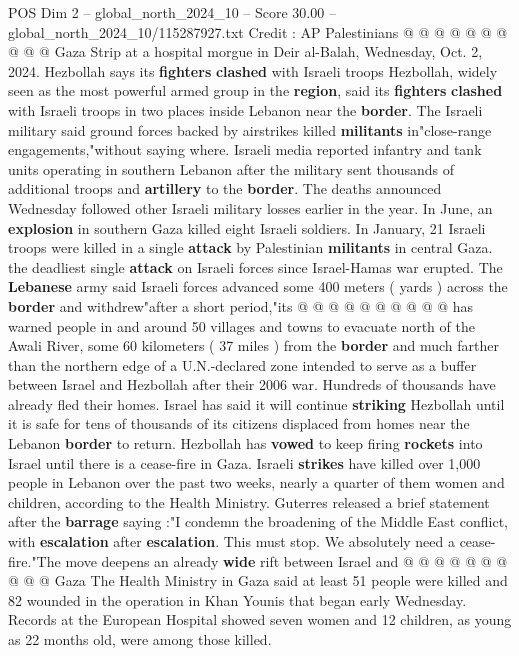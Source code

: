 \begin{textsample}{POS Dim 2 – global\_north\_2024\_10 – Score 30.00 – global\_north\_2024\_10/115287927.txt}
Credit : AP Palestinians @ @ @ @ @ @ @ @ @ @ Gaza Strip at a hospital morgue in Deir al-Balah, Wednesday, Oct. 2, 2024.
Hezbollah says its \textbf{fighters} \textbf{clashed} with Israeli troops Hezbollah, widely seen as the most powerful armed group in the \textbf{region}, said its \textbf{fighters} \textbf{clashed} with Israeli troops in two places inside Lebanon near the \textbf{border}.
The Israeli military said ground forces backed by airstrikes killed \textbf{militants} in"close-range engagements,"without saying where.
Israeli media reported infantry and tank units operating in southern Lebanon after the military sent thousands of additional troops and \textbf{artillery} to the \textbf{border}.
The deaths announced Wednesday followed other Israeli military losses earlier in the year.
In June, an \textbf{explosion} in southern Gaza killed eight Israeli soldiers.
In January, 21 Israeli troops were killed in a single \textbf{attack} by Palestinian \textbf{militants} in central Gaza. the deadliest single \textbf{attack} on Israeli forces since Israel-Hamas war erupted.
The \textbf{Lebanese} army said Israeli forces advanced some 400 meters ( yards ) across the \textbf{border} and withdrew"after a short period,"its @ @ @ @ @ @ @ @ @ @ has warned people in and around 50 villages and towns to evacuate north of the Awali River, some 60 kilometers ( 37 miles ) from the \textbf{border} and much farther than the northern edge of a U.N.-declared zone intended to serve as a buffer between Israel and Hezbollah after their 2006 war.
Hundreds of thousands have already fled their homes.
Israel has said it will continue \textbf{striking} Hezbollah until it is safe for tens of thousands of its citizens displaced from homes near the Lebanon \textbf{border} to return.
Hezbollah has \textbf{vowed} to keep firing \textbf{rockets} into Israel until there is a cease-fire in Gaza.
Israeli \textbf{strikes} have killed over 1,000 people in Lebanon over the past two weeks, nearly a quarter of them women and children, according to the Health Ministry.
Guterres released a brief statement after the \textbf{barrage} saying :"I condemn the broadening of the Middle East conflict, with \textbf{escalation} after \textbf{escalation}.
This must stop.
We absolutely need a cease-fire."The move deepens an already \textbf{wide} rift between Israel and @ @ @ @ @ @ @ @ @ @ Gaza The Health Ministry in Gaza said at least 51 people were killed and 82 wounded in the operation in Khan Younis that began early Wednesday.
Records at the European Hospital showed seven women and 12 children, as young as 22 months old, were among those killed.

\end{textsample}
